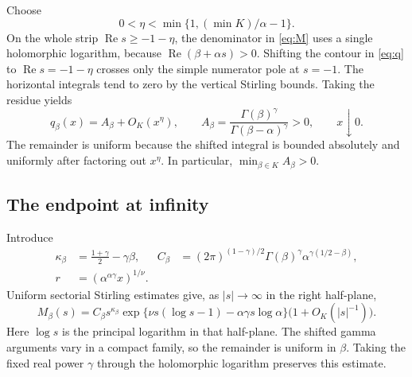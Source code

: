 \documentclass[11pt,a4paper]{article}
\numberwithin{equation}{section}
\theoremstyle{definition}\newtheorem{definition}[theorem]{Definition}
\theoremstyle{remark}\newtheorem{remark}[theorem]{Remark}
\DeclareMathOperator{\Rea}{Re}
\begin{document}
Choose
\begin{equation}\label{eq:eta}
 0<\eta<\min\{1,(\min K)/\alpha-1\}.
\end{equation}
On the whole strip \(\Rea s\ge-1-\eta\), the denominator in
\eqref{eq:M} uses a single holomorphic logarithm, because
\(\Rea(\beta+\alpha s)>0\). Shifting the contour in
\eqref{eq:q} to \(\Rea s=-1-\eta\) crosses only the simple
numerator pole at \(s=-1\). The horizontal integrals tend to zero
by the vertical Stirling bounds. Taking the residue yields
\begin{equation}\label{eq:small}
 q_\beta(x)=A_\beta+O_K(x^\eta),\qquad
 A_\beta=\frac{\Gamma(\beta)^\gamma}
 {\Gamma(\beta-\alpha)^\gamma}>0,
 \qquad x\downarrow0.
\end{equation}
The remainder is uniform because the shifted integral is bounded
absolutely and uniformly after factoring out \(x^\eta\).
In particular, \(\min_{\beta\in K}A_\beta>0\).

\subsection{The endpoint at infinity}

Introduce
\begin{align}
 \kappa_\beta&=\frac{1+\gamma}{2}-\gamma\beta,&
 C_\beta&=(2\pi)^{(1-\gamma)/2}\Gamma(\beta)^\gamma
 \alpha^{\gamma(1/2-\beta)},\label{eq:constants}\\
 r&=(\alpha^{\alpha\gamma}x)^{1/\nu}.&&\label{eq:r}
\end{align}
Uniform sectorial Stirling estimates \cite[Section 5.11]{DLMF} give,
as \(|s|\to\infty\) in the right half-plane,
\begin{equation}\label{eq:stirling}
 M_\beta(s)=C_\beta s^{\kappa_\beta}
 \exp\{\nu s(\log s-1)-\alpha\gamma s\log\alpha\}
 \bigl(1+O_K(|s|^{-1})\bigr).
\end{equation}
Here \(\log s\) is the principal logarithm in that half-plane. The
shifted gamma arguments vary in a compact family, so the remainder is
uniform in \(\beta\). Taking the fixed real power \(\gamma\)
through the holomorphic logarithm preserves this estimate.
\end{document}
